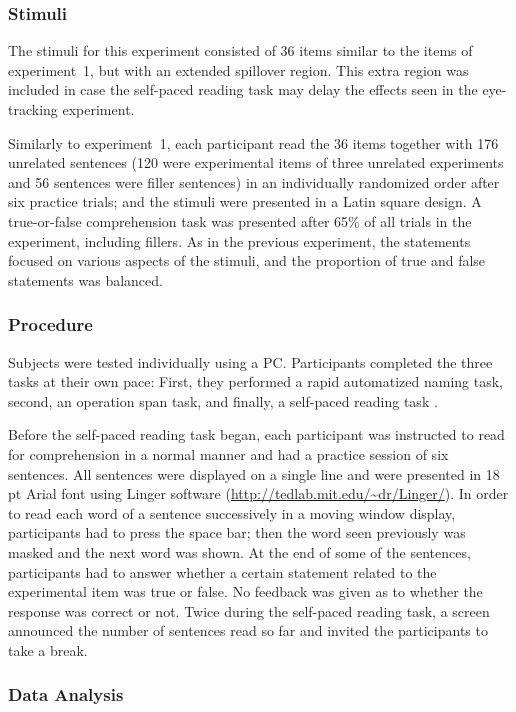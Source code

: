 \documentclass{frontiersSCNS}\usepackage{knitr}
\begin{document}
\subsubsection{Stimuli}
The stimuli for this experiment consisted of 36 items  similar to the items of experiment~1, but with an extended spillover region. This extra region was included in case the self-paced reading task may delay the effects seen in the eye-tracking experiment.
  
Similarly to experiment~1, each participant read the 36 items together with 176 unrelated sentences (120 were experimental items of three unrelated experiments and 56 sentences were filler sentences)  in an individually randomized order after six practice trials; and the stimuli were presented in a Latin square design. A true-or-false  comprehension task was presented after 65\%  of all trials in the experiment, including fillers. As in the previous experiment, the statements focused on various aspects of the stimuli, and the proportion of true and false statements was balanced.

 
\subsubsection{Procedure}
Subjects were tested individually using a PC. Participants completed the three tasks at their own pace: First, they performed a rapid automatized naming task, second,  an operation span task, and finally, a self-paced reading task \citep{JustEtAl1982}.

Before the self-paced reading task  began, each participant was instructed to read for comprehension in a normal manner and had a practice session of six sentences.  All sentences were displayed on a single line and were presented in 18 pt Arial font using Linger software (\url{http://tedlab.mit.edu/~dr/Linger/}). In order to read each word of a sentence successively in a moving window display, participants had to press the space bar; then the word seen previously was masked and the next word was shown. At the end of some of the sentences, participants had to answer whether a certain statement related to the experimental item was true or false. No feedback was given as to whether the response was correct or not. Twice during the self-paced reading task, a screen announced the number of sentences read so far and invited the participants to take a break.



\subsubsection{Data Analysis}
\end{document}
